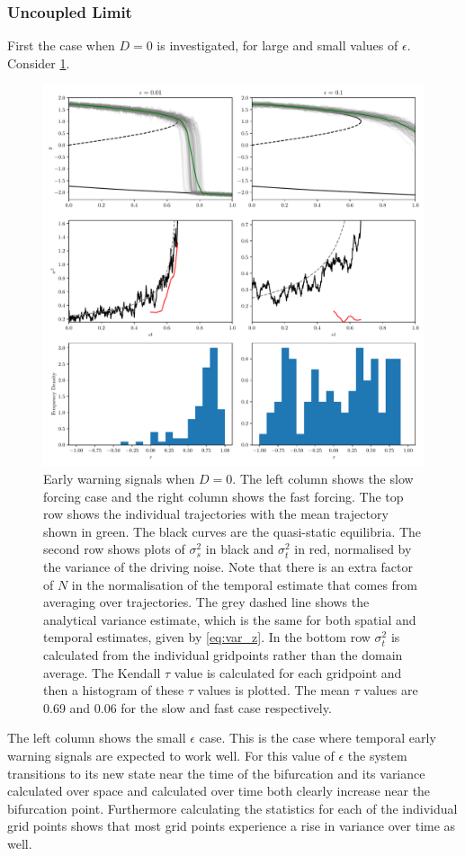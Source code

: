 \subsubsection{Uncoupled Limit}
First the case  when $D = 0$ is investigated, for large and small values of $\epsilon$. Consider \cref{fig:uncoupled_timeseries}.
\begin{figure}
  \centering
  \includegraphics[width=\textwidth,keepaspectratio]{uncoupled_variance}
  \caption[Early warning signals in the uncoupled limit]{Early warning signals when $D = 0$. The left column shows the slow forcing case and the right column shows the fast forcing.
    The top row shows the individual trajectories with the mean trajectory shown in green. The black curves are the quasi-static equilibria.
    The second row  shows plots of $\sigma_s^2$ in black and $\sigma_t^2$ in red, normalised by the variance of the driving noise. Note that there is an extra factor
    of $N$ in the normalisation of the temporal estimate that comes from averaging over trajectories. The grey dashed line shows the analytical variance
    estimate, which is the same for both spatial and temporal estimates, given by \cref{eq:var_z}. In the bottom row $\sigma_t^2$ is calculated from the individual gridpoints
    rather than the domain average.  The Kendall $\tau$ value is calculated for each gridpoint and then a histogram of these $\tau$ values is plotted. The mean $\tau$ values
    are 0.69 and 0.06 for the slow and fast case respectively.}
  \label{fig:uncoupled_timeseries}
\end{figure}
The left column shows the small $\epsilon$ case. This is the case
where temporal early warning signals are expected to work well. For this value of $\epsilon$ the system
transitions to its new state near the time of the bifurcation and its variance calculated over
space and calculated over time both clearly increase near the bifurcation point. Furthermore
calculating the statistics for each of the individual grid points shows that most grid points 
experience a rise in variance over time as well.

